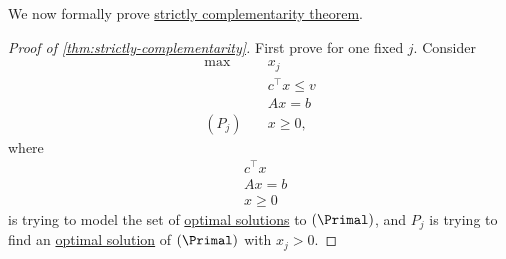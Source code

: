 We now formally prove \hyperref[thm:strictly-complementarity]{strictly complementarity theorem}.

\begin{proof}[Proof of \autoref{thm:strictly-complementarity}]
	First prove for one fixed \(j\). Consider
	\[
		\begin{aligned}
			\max~        & x_{j}            \\
			             & c^{\top}x \leq v \\
			             & Ax = b           \\
			(P_{j})\quad & x\geq 0,
		\end{aligned}
	\]
	where
	\[
		\begin{aligned}
			 & c^{\top}x \\
			 & Ax = b    \\
			 & x\geq 0
		\end{aligned}
	\]
	is trying to model the set of \hyperref[def:optimal-solution]{optimal solutions} to \((\Primal)\), and \(P_{j}\) is trying to find an \hyperref[def:optimal-solution]{optimal solution} of \((\Primal)\) with \(x_{j}>0\).


\end{proof}
